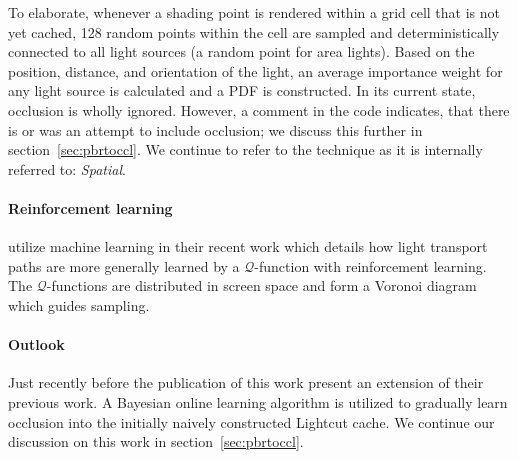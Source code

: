 To elaborate, whenever a shading point is rendered within a grid cell that is not yet cached, 128 random points within the cell are sampled and deterministically connected to all light sources (a random point for area lights). Based on the position, distance, and orientation of the light, an average importance weight for any light source is calculated and a PDF is constructed. In its current state, occlusion is wholly ignored. However, a comment in the code indicates, that there is or was an attempt to include occlusion; we discuss this further in section~\ref{sec:pbrtoccl}. We continue to refer to the technique as it is internally referred to: \textit{Spatial}.

\paragraph{Reinforcement learning}

\parencite{DBLP:journals/corr/DahmK17} utilize machine learning in their recent work which details how light transport paths are more generally learned by a $\mathcal{Q}$-function with reinforcement learning. The $\mathcal{Q}$-functions are distributed in screen space and form a Voronoi diagram which guides sampling.

\paragraph{Outlook}

Just recently before the publication of this work \textcite{Vevoda:2018:BOR} present an extension of their previous work. A Bayesian online learning algorithm is utilized to gradually learn occlusion into the initially naively constructed Lightcut cache. We continue our discussion on this work in section~\ref{sec:pbrtoccl}.